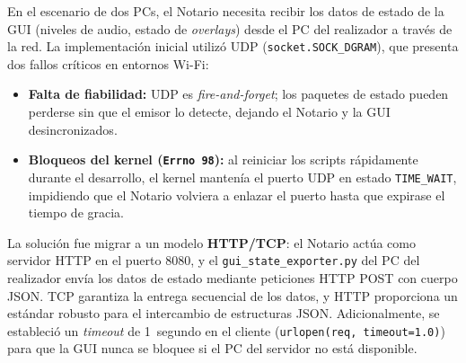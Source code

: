 En el escenario de dos PCs, el Notario necesita recibir los datos de estado de la GUI
(niveles de audio, estado de \textit{overlays}) desde el PC del realizador a través de la red.
La implementación inicial utilizó UDP (\texttt{socket.SOCK\_DGRAM}), que presenta dos
fallos críticos en entornos Wi-Fi:

\begin{itemize}
  \item \textbf{Falta de fiabilidad:} UDP es \textit{fire-and-forget}; los paquetes
        de estado pueden perderse sin que el emisor lo detecte, dejando el Notario y
        la GUI desincronizados.
  \item \textbf{Bloqueos del kernel (\texttt{Errno 98}):} al reiniciar los scripts
        rápidamente durante el desarrollo, el kernel mantenía el puerto UDP en estado
        \texttt{TIME\_WAIT}, impidiendo que el Notario volviera a enlazar el puerto
        hasta que expirase el tiempo de gracia.
\end{itemize}

La solución fue migrar a un modelo \textbf{HTTP/TCP}: el Notario actúa como servidor
HTTP en el puerto 8080, y el \texttt{gui\_state\_exporter.py} del PC del realizador
envía los datos de estado mediante peticiones HTTP POST con cuerpo JSON. TCP garantiza
la entrega secuencial de los datos, y HTTP proporciona un estándar robusto para el
intercambio de estructuras JSON. Adicionalmente, se estableció un \textit{timeout} de
1~segundo en el cliente (\texttt{urlopen(req, timeout=1.0)}) para que la GUI nunca se
bloquee si el PC del servidor no está disponible.
